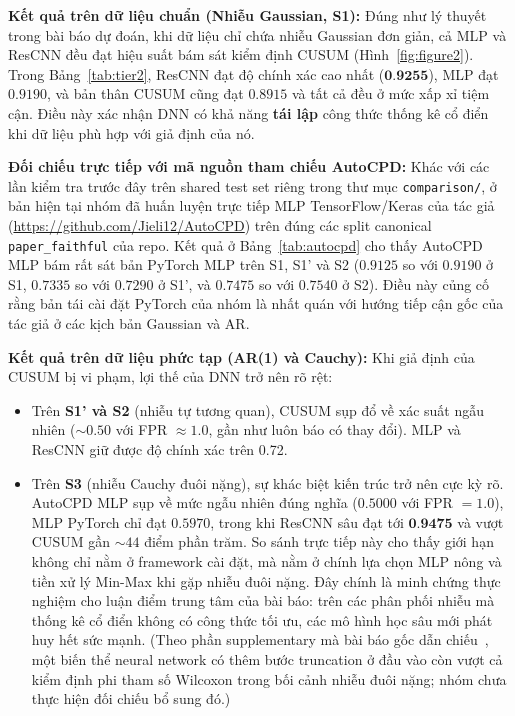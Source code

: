 \textbf{Kết quả trên dữ liệu chuẩn (Nhiễu Gaussian, S1):} Đúng như lý thuyết trong bài báo dự đoán, 
khi dữ liệu chỉ chứa nhiễu Gaussian đơn giản, cả MLP và ResCNN đều đạt hiệu suất bám sát kiểm định CUSUM 
(Hình~\ref{fig:figure2}). Trong Bảng~\ref{tab:tier2}, ResCNN đạt độ chính xác cao nhất ($\textbf{0.9255}$), 
MLP đạt $0.9190$, và bản thân CUSUM cũng đạt $0.8915$ và tất cả đều ở mức xấp xỉ tiệm cận. 
Điều này xác nhận DNN có khả năng \textbf{tái lập} công thức thống kê cổ điển khi dữ liệu phù hợp với giả định của nó.

\textbf{Đối chiếu trực tiếp với mã nguồn tham chiếu AutoCPD:} Khác với các lần kiểm tra trước đây trên shared test set riêng trong thư mục \texttt{comparison/}, 
ở bản hiện tại nhóm đã huấn luyện trực tiếp MLP TensorFlow/Keras của tác giả 
(\url{https://github.com/Jieli12/AutoCPD}) trên đúng các split canonical \texttt{paper\_faithful} của repo. 
Kết quả ở Bảng~\ref{tab:autocpd} cho thấy AutoCPD MLP bám rất sát bản PyTorch MLP trên S1, S1' và S2 
($0.9125$ so với $0.9190$ ở S1, $0.7335$ so với $0.7290$ ở S1', và $0.7475$ so với $0.7540$ ở S2). 
Điều này củng cố rằng bản tái cài đặt PyTorch của nhóm là nhất quán với hướng tiếp cận gốc của tác giả ở các kịch bản Gaussian và AR.

\textbf{Kết quả trên dữ liệu phức tạp (AR(1) và Cauchy):} Khi giả định của CUSUM bị vi phạm, lợi thế của DNN trở nên rõ rệt:
\begin{itemize}
    \item Trên \textbf{S1' và S2} (nhiễu tự tương quan), CUSUM sụp đổ về xác suất ngẫu nhiên ($\sim 0.50$ với FPR $\approx 1.0$, 
    gần như luôn báo có thay đổi). MLP và ResCNN giữ được độ chính xác trên 0.72.
    \item Trên \textbf{S3} (nhiễu Cauchy đuôi nặng), sự khác biệt kiến trúc trở nên cực kỳ rõ. 
    AutoCPD MLP sụp về mức ngẫu nhiên đúng nghĩa ($0.5000$ với FPR $= 1.0$), MLP PyTorch chỉ đạt $0.5970$, 
    trong khi ResCNN sâu đạt tới $\textbf{0.9475}$ và vượt CUSUM gần $\sim 44$ điểm phần trăm. 
    So sánh trực tiếp này cho thấy giới hạn không chỉ nằm ở framework cài đặt, mà nằm ở chính lựa chọn MLP nông và tiền xử lý Min-Max khi gặp nhiễu đuôi nặng.
    Đây chính là minh chứng thực nghiệm cho luận điểm trung tâm của bài báo: 
    trên các phân phối nhiễu mà thống kê cổ điển không có công thức tối ưu, các mô hình học sâu mới phát huy hết sức mạnh. 
    (Theo phần supplementary mà bài báo gốc dẫn chiếu~\cite{li2024automatic}, một biến thể neural network có thêm bước truncation ở đầu vào còn vượt cả 
    kiểm định phi tham số Wilcoxon trong bối cảnh nhiễu đuôi nặng; nhóm chưa thực hiện đối chiếu bổ sung đó.)
\end{itemize}

